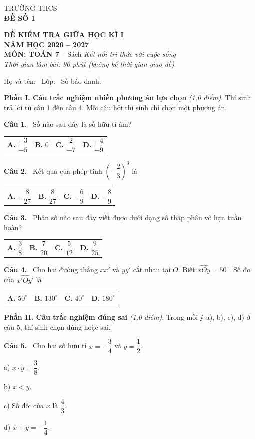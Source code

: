 \documentclass[12pt,a4paper]{article}
\makeatletter
\newcommand{\bonpa}[4]{\par\noindent\begin{tabularx}{\linewidth}{@{\hspace{0.6cm}}XXXX@{}}
\textbf{A.} #1 & \textbf{B.} #2 & \textbf{C.} #3 & \textbf{D.} #4\end{tabularx}\par}
\newcommand{\cau}[1]{\par\medskip\textbf{Câu #1.}~}
\newcommand{\y}[1]{\par\hspace*{0.6cm}#1}
\newcommand{\phan}[1]{\par\bigskip{\large\textbf{#1}}\par\smallskip}
\makeatother
\begin{document}
\noindent
\begin{minipage}[t]{0.38\linewidth}\centering
TRƯỜNG THCS \dotfill\\[2pt]
\textbf{ĐỀ SỐ 1}
\end{minipage}\hfill
\begin{minipage}[t]{0.6\linewidth}\centering
\textbf{ĐỀ KIỂM TRA GIỮA HỌC KÌ I}\\
\textbf{NĂM HỌC 2026 -- 2027}\\
\textbf{MÔN: TOÁN 7} -- Sách \textit{Kết nối tri thức với cuộc sống}\\
\textit{Thời gian làm bài: 90 phút (không kể thời gian giao đề)}
\end{minipage}

\medskip
Họ và tên: \dotfill\ Lớp: \makebox[2cm]{\dotfill}\ Số báo danh: \makebox[2.5cm]{\dotfill}
\phan{A. TRẮC NGHIỆM (3,0 điểm)}
\textbf{Phần I. Câu trắc nghiệm nhiều phương án lựa chọn} \textit{(1,0 điểm)}. Thí sinh trả lời từ câu 1 đến câu 4. Mỗi câu hỏi thí sinh chỉ chọn một phương án.
\cau{1} Số nào sau đây là số hữu tỉ âm?
\bonpa{$\dfrac{-3}{-5}$}{$0$}{$\dfrac{2}{-7}$}{$\dfrac{-4}{-9}$}
\cau{2} Kết quả của phép tính $\left(-\dfrac{2}{3}\right)^{3}$ là
\bonpa{$-\dfrac{8}{27}$}{$\dfrac{8}{27}$}{$-\dfrac{6}{9}$}{$-\dfrac{8}{9}$}
\cau{3} Phân số nào sau đây viết được dưới dạng số thập phân vô hạn tuần hoàn?
\bonpa{$\dfrac{3}{8}$}{$\dfrac{7}{20}$}{$\dfrac{5}{12}$}{$\dfrac{9}{25}$}
\cau{4} Cho hai đường thẳng $xx'$ và $yy'$ cắt nhau tại $O$. Biết $\widehat{xOy}=50^\circ$. Số đo của $\widehat{x'Oy'}$ là
\bonpa{$50^\circ$}{$130^\circ$}{$40^\circ$}{$180^\circ$}

\medskip\textbf{Phần II. Câu trắc nghiệm đúng sai} \textit{(1,0 điểm)}. Trong mỗi ý a), b), c), d) ở câu 5, thí sinh chọn đúng hoặc sai.
\cau{5} Cho hai số hữu tỉ $x=-\dfrac{3}{4}$ và $y=\dfrac{1}{2}$.
\y{a) $x\cdot y=\dfrac{3}{8}$.}
\y{b) $x<y$.}
\y{c) Số đối của $x$ là $\dfrac{4}{3}$.}
\y{d) $x+y=-\dfrac{1}{4}$.}
\end{document}
